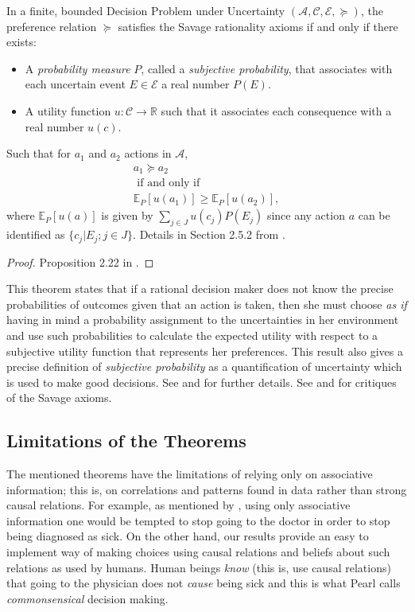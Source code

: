 \documentclass{svjour3}                     %
\begin{document}
\begin{theorem}[Savage]{\label{savage}}
In a finite, bounded Decision Problem under Uncertainty $(\mathcal{A}, \mathcal{C}, \mathcal{E}, \succeq)$, the preference relation $\succeq$ satisfies the Savage rationality axioms if and only if there exists: 
\begin{itemize}
\item A \textit{probability measure} $P$, called a \textit{subjective probability}, that associates with each uncertain event $E \in \mathcal{E}$ a real number $P(E)$. 
\item A utility function $u : \mathcal{C} \to \mathbb{R}$ such that it associates each consequence with a real number $u(c)$. 
\end{itemize}
Such that for $a_1$ and $a_2$ actions in $\mathcal{A}$,
\begin{eqnarray*}
 &a_1 \succeq a_2&\\
 & \textrm{ if and only if }&\\
 &\mathbb{E}_P[u(a_1)] \geq  \mathbb{E}_P[u(a_2)],&
\end{eqnarray*}
where $\mathbb{E}_P[u(a)]$ is given by $\sum_{j \in J} u(c_j) P(E_j)$ since any action $a$ can be identified as $\{ c_j | E_j ; j \in J \}.$ Details in Section 2.5.2 from \cite{bernardo2000bayesian}.
\end{theorem}
\begin{proof}
Proposition 2.22 in \cite{bernardo2000bayesian}.
\end{proof}
This theorem states that if a rational decision maker does not know the precise probabilities of outcomes given that an action is taken, then she must choose \textit{as if} having in mind a probability assignment to the uncertainties in her environment and use such probabilities to calculate the expected utility with respect to a subjective utility function that represents her preferences. This result also gives a precise definition of \textit{subjective probability} as a quantification of uncertainty which is used to make good decisions. See \cite{hens1992note} and \cite{gilboa2009decision} for further details. See \cite{ellsberg1961risk} and \cite{binmore2008rational} for critiques of the Savage axioms. 

\subsection{Limitations of the Theorems}
\label{theorems_limitations}
The mentioned theorems have the limitations of relying only on associative information; this is, on correlations and patterns found in data rather than strong causal relations. For example, as mentioned by \cite{pearl2009causality}, using only associative information one would be tempted to stop going to the doctor in order to stop being diagnosed as sick. On the other hand, our results provide an easy to implement way of making choices using causal relations and beliefs about such relations as used by humans. Human beings \textit{know} (this is, use causal relations) that going to the physician does not \textit{cause} being sick and this is what Pearl calls \textit{commonsensical} decision making.
\end{document}
